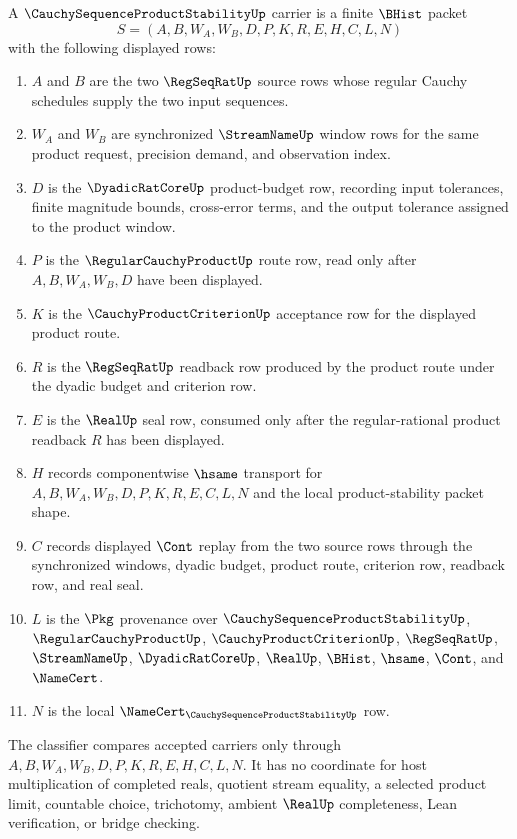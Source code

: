 \begin{definition}
\label{def:cauchy-sequence-product-stability-carrier}
A $\CauchySequenceProductStabilityUp$ carrier is a finite $\BHist$ packet
$$
S=(A,B,W_A,W_B,D,P,K,R,E,H,C,L,N)
$$
with the following displayed rows:
\begin{enumerate}
\item $A$ and $B$ are the two $\RegSeqRatUp$ source rows whose regular Cauchy schedules supply the two input sequences.
\item $W_A$ and $W_B$ are synchronized $\StreamNameUp$ window rows for the same product request, precision demand, and observation index.
\item $D$ is the $\DyadicRatCoreUp$ product-budget row, recording input tolerances, finite magnitude bounds, cross-error terms, and the output tolerance assigned to the product window.
\item $P$ is the $\RegularCauchyProductUp$ route row, read only after $A,B,W_A,W_B,D$ have been displayed.
\item $K$ is the $\CauchyProductCriterionUp$ acceptance row for the displayed product route.
\item $R$ is the $\RegSeqRatUp$ readback row produced by the product route under the dyadic budget and criterion row.
\item $E$ is the $\RealUp$ seal row, consumed only after the regular-rational product readback $R$ has been displayed.
\item $H$ records componentwise $\hsame$ transport for $A,B,W_A,W_B,D,P,K,R,E,C,L,N$ and the local product-stability packet shape.
\item $C$ records displayed $\Cont$ replay from the two source rows through the synchronized windows, dyadic budget, product route, criterion row, readback row, and real seal.
\item $L$ is the $\Pkg$ provenance over $\CauchySequenceProductStabilityUp$, $\RegularCauchyProductUp$, $\CauchyProductCriterionUp$, $\RegSeqRatUp$, $\StreamNameUp$, $\DyadicRatCoreUp$, $\RealUp$, $\BHist$, $\hsame$, $\Cont$, and $\NameCert$.
\item $N$ is the local $\NameCert_{\CauchySequenceProductStabilityUp}$ row.
\end{enumerate}
The classifier compares accepted carriers only through $A,B,W_A,W_B,D,P,K,R,E,H,C,L,N$. It has no coordinate for host multiplication of completed reals, quotient stream equality, a selected product limit, countable choice, trichotomy, ambient $\RealUp$ completeness, Lean verification, or bridge checking.
\end{definition}

